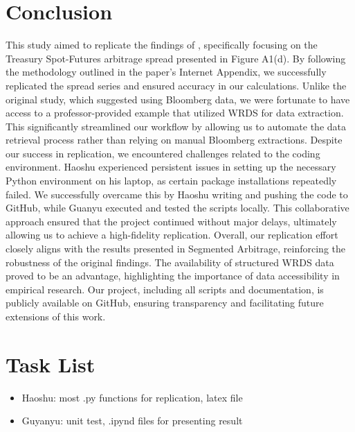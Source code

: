 \documentclass{article}
\begin{document}
\section{Conclusion}
This study aimed to replicate the findings of \cite{siriwardane2023segmented}, specifically focusing on the Treasury Spot-Futures arbitrage spread presented in Figure A1(d). By following the methodology outlined in the paper’s Internet Appendix, we successfully replicated the spread series and ensured accuracy in our calculations. Unlike the original study, which suggested using Bloomberg data, we were fortunate to have access to a professor-provided example that utilized WRDS for data extraction. This significantly streamlined our workflow by allowing us to automate the data retrieval process rather than relying on manual Bloomberg extractions.
Despite our success in replication, we encountered challenges related to the coding environment. Haoshu experienced persistent issues in setting up the necessary Python environment on his laptop, as certain package installations repeatedly failed. We successfully overcame this by Haoshu writing and pushing the code to GitHub, while Guanyu executed and tested the scripts locally. This collaborative approach ensured that the project continued without major delays, ultimately allowing us to achieve a high-fidelity replication.
Overall, our replication effort closely aligns with the results presented in Segmented Arbitrage, reinforcing the robustness of the original findings. The availability of structured WRDS data proved to be an advantage, highlighting the importance of data accessibility in empirical research. Our project, including all scripts and documentation, is publicly available on GitHub, ensuring transparency and facilitating future extensions of this work.
\section{Task List}

\begin{itemize}
    \item Haoshu: most .py functions for replication, latex file
    \item Guyanyu: unit test, .ipynd files for presenting result
\end{itemize}












\clearpage
 





\end{document}

